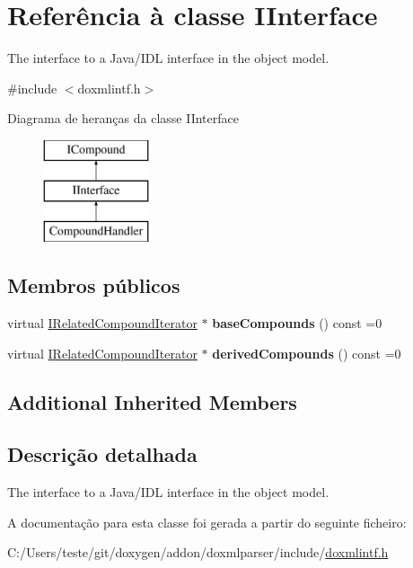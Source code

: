 \hypertarget{class_i_interface}{\section{Referência à classe I\-Interface}
\label{class_i_interface}
}


The interface to a Java/\-I\-D\-L interface in the object model.  




{\ttfamily \#include $<$doxmlintf.\-h$>$}

Diagrama de heranças da classe I\-Interface\begin{figure}[H]
\begin{center}
\leavevmode
\includegraphics[height=3.000000cm]{class_i_interface}
\end{center}
\end{figure}
\subsection*{Membros públicos}
\begin{DoxyCompactItemize}
\item 
\hypertarget{class_i_interface_a226f8a714bede3ebbac649e35dee67f1}{virtual \hyperlink{class_i_related_compound_iterator}{I\-Related\-Compound\-Iterator} $\ast$ {\bfseries base\-Compounds} () const =0}\label{class_i_interface_a226f8a714bede3ebbac649e35dee67f1}

\item 
\hypertarget{class_i_interface_a90c089115e36f8a84f78d172a249a4fd}{virtual \hyperlink{class_i_related_compound_iterator}{I\-Related\-Compound\-Iterator} $\ast$ {\bfseries derived\-Compounds} () const =0}\label{class_i_interface_a90c089115e36f8a84f78d172a249a4fd}

\end{DoxyCompactItemize}
\subsection*{Additional Inherited Members}


\subsection{Descrição detalhada}
The interface to a Java/\-I\-D\-L interface in the object model. 

A documentação para esta classe foi gerada a partir do seguinte ficheiro\-:\begin{DoxyCompactItemize}
\item 
C\-:/\-Users/teste/git/doxygen/addon/doxmlparser/include/\hyperlink{include_2doxmlintf_8h}{doxmlintf.\-h}\end{DoxyCompactItemize}
